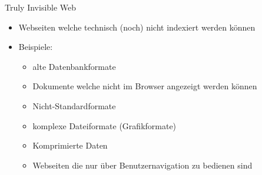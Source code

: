 \documentclass[12pt]{beamer}
\begin{document}
\begin{frame}{Truly Invisible Web}
	\begin{itemize}
		\item Webseiten welche technisch (noch) nicht indexiert werden können
		\item Beispiele:
		\begin{itemize}
			\item alte Datenbankformate
			\item Dokumente welche nicht im Browser angezeigt werden können
			\item Nicht-Standardformate
			\item komplexe Dateiformate (Grafikformate)
			\item Komprimierte Daten
			\item Webseiten die nur über Benutzernavigation zu bedienen sind
		\end{itemize}
	\end{itemize} 
\end{frame}
\end{document}
